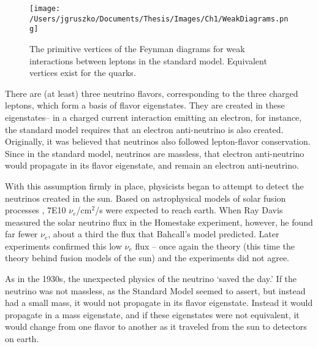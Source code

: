 \begin{figure}[h]
\hfil \texttt{[image: /Users/jgruszko/Documents/Thesis/Images/Ch1/WeakDiagrams.png]} \hfil
\caption{The primitive vertices of the Feynman diagrams for weak interactions between leptons in the standard model. Equivalent vertices exist for the quarks. \cite{PDG2014}}
\label{weak_diagrams}
\end{figure}

There are (at least) three neutrino flavors, corresponding to the three charged leptons, which form a basis of flavor eigenstates. They are created in these eigenstates-- in a charged current interaction emitting an electron, for instance, the standard model requires that an electron anti-neutrino is also created. Originally, it was believed that neutrinos also followed lepton-flavor conservation. Since in the standard model, neutrinos are massless, that electron anti-neutrino would propagate in its flavor eigenstate, and remain an electron anti-neutrino. 

With this assumption firmly in place, physicists began to attempt to detect the neutrinos created in the sun. Based on astrophysical models of solar fusion processes \cite{Bahcall}, 7E10 $\nu_{e}$/cm$^2$/s were expected to reach earth. When Ray Davis measured the solar neutrino flux in the Homestake experiment, however, he found far fewer $\nu_{e}$, about a third the flux that Bahcall's model predicted. Later experiments confirmed this low $\nu_{e}$ flux -- once again the theory (this time the theory behind fusion models of the sun) and the experiments did not agree.

As in the 1930s, the unexpected physics of the neutrino `saved the day.' If the neutrino was not massless, as the Standard Model seemed to assert, but instead had a small mass, it would not propagate in its flavor eigenstate. Instead it would propagate in a mass eigenstate, and if these eigenstates were not equivalent, it would change from one flavor to another as it traveled from the sun to detectors on earth. 

